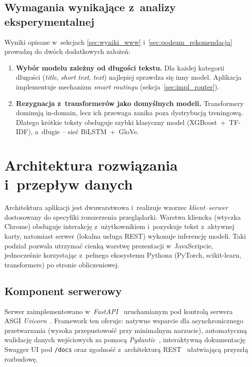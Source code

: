 \documentclass[oneside,polski,logo]{amuthesis}
\begin{document}
\subsection*{Wymagania wynikające z~analizy eksperymentalnej}

Wyniki opisane w~sekcjach \ref{sec:wyniki_www} i~\ref{sec:podsum_rekomendacja}
prowadzą do dwóch dodatkowych założeń:

\begin{enumerate}
  \item \textbf{Wybór modelu zależny od długości tekstu.} Dla każdej
        kategorii długości (\textit{title}, \textit{short text},
        \textit{text}) najlepiej sprawdza się inny model. Aplikacja
        implementuje mechanizm \textit{smart routingu} (sekcja~\ref{sec:impl_router}).
  \item \textbf{Rezygnacja z~transformerów jako domyślnych modeli.}
        Transformery dominują in-domain, lecz ich przewaga zanika
        poza dystrybucją treningową. Dlatego krótkie teksty obsługuje
        szybki klasyczny model (XGBoost~+~TF-IDF), a~długie -- sieć
        BiLSTM~+~GloVe.
\end{enumerate}

\section{Architektura rozwiązania i~przepływ danych}
\label{sec:impl_architektura}

Architektura aplikacji jest dwuwarstwowa i~realizuje wzorzec
\emph{klient--serwer} dostosowany do specyfiki rozszerzenia przeglądarki.
Warstwa kliencka (wtyczka Chrome) obsługuje interakcję z~użytkownikiem
i~pozyskuje tekst z~aktywnej karty, natomiast serwer (lokalna usługa
REST) wykonuje inferencję modeli. Taki podział pozwala utrzymać cienką
warstwę prezentacji w~JavaScripcie, jednocześnie korzystając z~pełnego
ekosystemu Pythona (PyTorch, scikit-learn, transformers) po stronie
obliczeniowej.

\subsection*{Komponent serwerowy}

Serwer zaimplementowano w~\textit{FastAPI}~\cite{fastapi_docs}
uruchamianym pod kontrolą serwera ASGI \textit{Uvicorn}~\cite{uvicorn_docs}.
Framework ten oferuje: natywne wsparcie dla asynchronicznego przetwarzania
(wysoka przepustowość przy minimalnym narzucie), automatyczną walidację
danych wejściowych za pomocą \textit{Pydantic}~\cite{pydantic_docs},
interaktywną dokumentację Swagger UI pod \texttt{/docs} oraz zgodność
z~architekturą REST~\cite{fielding2000rest} ułatwiającą przyszłą rozbudowę.
\end{document}
